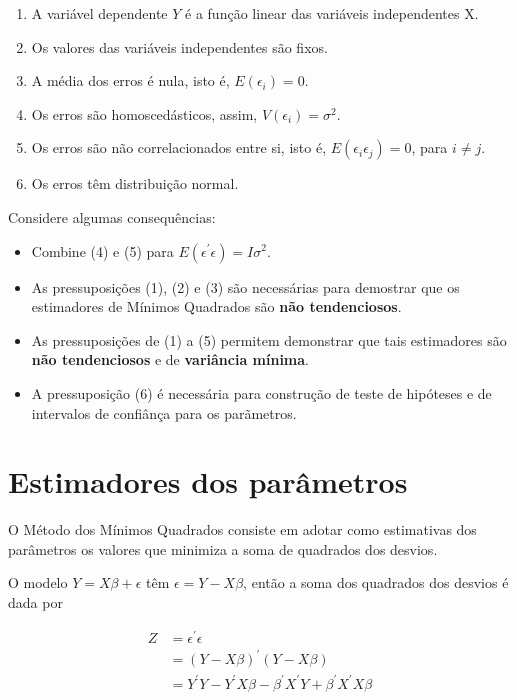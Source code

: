 \documentclass[
]{book}
\providecommand{\tightlist}{%
  \setlength{\itemsep}{0pt}\setlength{\parskip}{0pt}}
\begin{document}
\begin{enumerate}
\def\labelenumi{\arabic{enumi}.}
\tightlist
\item
  A variável dependente \(Y\) é a função linear das variáveis independentes X.
\item
  Os valores das variáveis independentes são fixos.
\item
  A média dos erros é nula, isto é, \(E\left(\epsilon_i\right)=0\).
\item
  Os erros são homoscedásticos, assim, \(V\left(\epsilon_i\right)=\sigma^2\).
\item
  Os erros são não correlacionados entre si, isto é, \(E\left(\epsilon_i\epsilon_j\right)=0\), para \(i \ne j\).
\item
  Os erros têm distribuição normal.
\end{enumerate}

Considere algumas consequências:

\begin{itemize}
\item
  Combine (4) e (5) para \(E\left(\epsilon^\prime\epsilon\right)=I\sigma^2\).
\item
  As pressuposições (1), (2) e (3) são necessárias para demostrar que os estimadores de Mínimos Quadrados são \textbf{não tendenciosos}.
\item
  As pressuposições de (1) a (5) permitem demonstrar que tais estimadores são \textbf{não tendenciosos} e de \textbf{variância mínima}.
\item
  A pressuposição (6) é necessária para construção de teste de hipóteses e de intervalos de confiânça para os parãmetros.
\end{itemize}

\hypertarget{estimadores-dos-paruxe2metros}{%
\section{Estimadores dos parâmetros}\label{estimadores-dos-paruxe2metros}}

O Método dos Mínimos Quadrados consiste em adotar como estimativas dos parâmetros os valores que minimiza a soma de quadrados dos desvios.

O modelo \(Y = X\beta+\epsilon\) têm \(\epsilon = Y - X\beta\), então a soma dos quadrados dos desvios é dada por

\begin{align}
Z &= \epsilon^\prime\epsilon \\
  &= \left(Y-X\beta\right)^\prime\left(Y-X\beta\right)\\
  &= Y^\prime Y - Y^\prime X\beta - \beta^\prime X^\prime Y + \beta^\prime X^\prime X \beta
\end{align}
\end{document}
